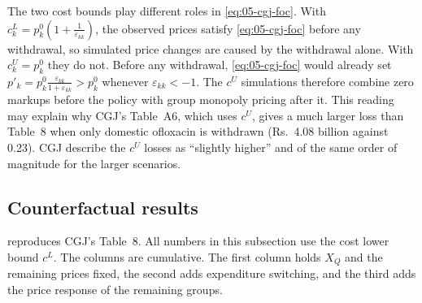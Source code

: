 \begin{remark}\label{rem:05-cgj-cU}
The two cost bounds play different roles in \eqref{eq:05-cgj-foc}. With $c^L_{k} = p^0_k(1 + \frac{1}{\varepsilon_{kk}})$,
the observed prices satisfy \eqref{eq:05-cgj-foc} before any withdrawal, so simulated price changes are caused by the
withdrawal alone. With $c^U_k = p^0_k$ they do not. Before any withdrawal, \eqref{eq:05-cgj-foc} would already set
$p'_k = p^0_k\frac{\varepsilon_{kk}}{1 + \varepsilon_{kk}} > p^0_k$ whenever $\varepsilon_{kk} < -1$. The $c^U$
simulations therefore combine zero markups before the policy with group monopoly pricing after it. This reading may
explain why CGJ's Table~A6, which uses $c^U$, gives a much larger loss than Table~8 when only domestic ofloxacin is
withdrawn (Rs.~4.08 billion against 0.23). CGJ describe the $c^U$ losses as ``slightly higher'' and of the same order
of magnitude for the larger scenarios.
\end{remark}

\subsection{Counterfactual results}\label{sec:05-cgj-results}

  reproduces CGJ's Table~8. All numbers in this subsection use
the cost lower bound $c^L$. The columns are cumulative. The first column holds $X_Q$ and the remaining prices fixed,
the second adds expenditure switching, and the third adds the price response of the remaining groups.

